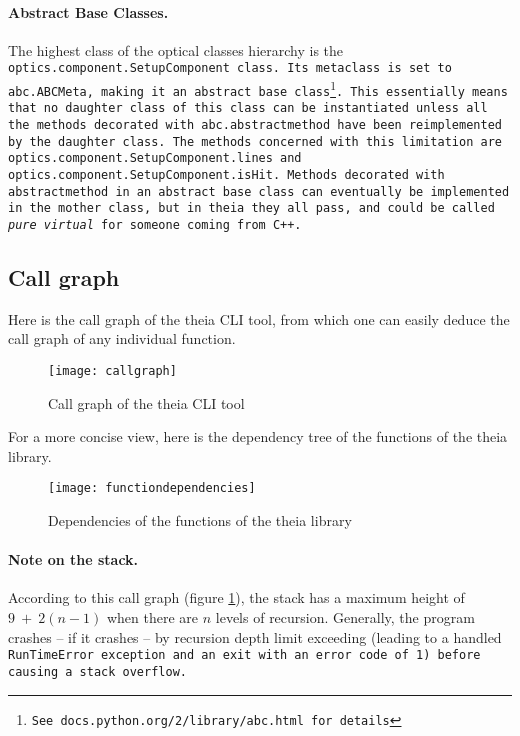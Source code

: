\documentclass{article}
\begin{document}
\paragraph{Abstract Base Classes.}The highest class of the optical classes hierarchy is the \tt{optics.component.SetupComponent} class. Its metaclass is set to \tt{abc.ABCMeta}, making it an abstract base class\footnote{See \tt{docs.python.org/2/library/abc.html} for details}. This essentially means that no daughter class of this class can be instantiated unless all the methods decorated with \tt{abc.abstractmethod} have been reimplemented by the daughter class. The methods concerned with this limitation are \tt{optics.component.SetupComponent.lines} and \tt{optics.component.SetupComponent.isHit}. Methods decorated with \tt{abstractmethod} in an abstract base class can eventually be implemented in the mother class, but in theia they all \tt{pass}, and could be called \textit{pure virtual} for someone coming from C++.
\subsection{Call graph}

Here is the call graph of the theia CLI tool, from which one can easily deduce the call graph of any individual function.


\begin{figure}[h]
\begin{center}
\texttt{[image: callgraph]}
\end{center}
\caption{Call graph of the theia CLI tool}
\label{callgraph}
\end{figure}

For a more concise view, here is the dependency tree of the functions of the theia library.

\begin{figure}[h]
\begin{center}
\texttt{[image: functiondependencies]}
\end{center}
\caption{Dependencies of the functions of the theia library}
\end{figure}

\paragraph{Note on the stack.}According to this call graph (figure \ref{callgraph}), the stack has a maximum height of $9~+~2(n-1)$ when there are $n$ levels of recursion. Generally, the program crashes -- if it crashes -- by recursion depth limit exceeding (leading to a handled \tt{RunTimeError} exception and an exit with an error code of 1) before causing a stack overflow.
\end{document}
